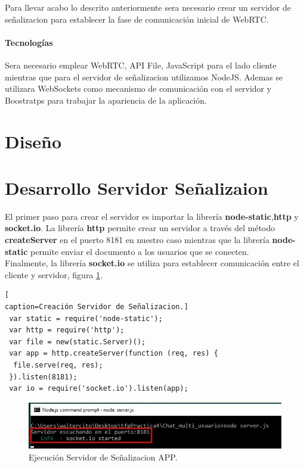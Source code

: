 Para llevar acabo lo descrito anteriormente sera necesario crear un servidor de señalizacion para establecer la fase  de comunicación inicial de WebRTC.
\paragraph{Tecnologías}
Sera necesario emplear WebRTC, API File, JavaScript para el lado cliente mientras que para el servidor de señalizacion utilizamos NodeJS. Ademas se utilizara WebSockets como mecanismo de comunicación con el servidor y Boostratps para trabajar la apariencia de la aplicación.
\section{Diseño}
\section{Desarrollo Servidor Señalizaion}
El primer paso para crear el servidor es importar la librería \textbf{node-static},\textbf{http} y \textbf{socket.io}. La librería \textbf{http} permite crear un servidor a través del método \textbf{createServer} en el puerto 8181 en nuestro caso mientras que la librería \textbf{node-static} permite enviar el documento a los usuarios que se conecten.
\\Finalmente, la librería \textbf{socket.io} se utiliza para establecer comunicación entre el cliente y servidor, figura \ref{fig:EjecucionServer}.
\begin{lstlisting}[
caption=Creación Servidor de Señalizacion.]
 var static = require('node-static');
 var http = require('http');
 var file = new(static.Server)();
 var app = http.createServer(function (req, res) {
  file.serve(req, res);
 }).listen(8181);
 var io = require('socket.io').listen(app);
\end{lstlisting}
\begin{figure}[!h]
\begin{center}
   \includegraphics[width=0.8\linewidth]{Figures/InicioServidor}
	\decoRule
	\caption[ServidorSeñalizacion]{Ejecución Servidor de Señalizacion APP.}
\label{fig:EjecucionServer}
\end{center}
\end{figure}
